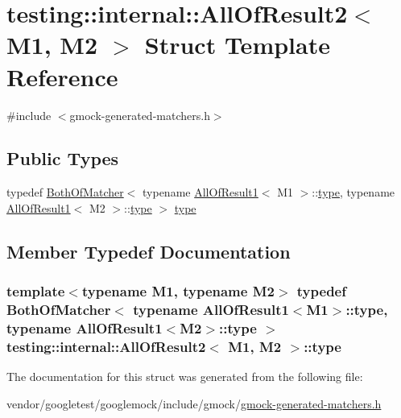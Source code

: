 \hypertarget{structtesting_1_1internal_1_1AllOfResult2}{}\section{testing\+:\+:internal\+:\+:All\+Of\+Result2$<$ M1, M2 $>$ Struct Template Reference}
\label{structtesting_1_1internal_1_1AllOfResult2}


{\ttfamily \#include $<$gmock-\/generated-\/matchers.\+h$>$}

\subsection*{Public Types}
\begin{DoxyCompactItemize}
\item 
typedef \hyperlink{classtesting_1_1internal_1_1BothOfMatcher}{Both\+Of\+Matcher}$<$ typename \hyperlink{structtesting_1_1internal_1_1AllOfResult1}{All\+Of\+Result1}$<$ M1 $>$\+::\hyperlink{structtesting_1_1internal_1_1AllOfResult2_adec0b0ce2fdd07d398e1fdd2cdb88392}{type}, typename \hyperlink{structtesting_1_1internal_1_1AllOfResult1}{All\+Of\+Result1}$<$ M2 $>$\+::\hyperlink{structtesting_1_1internal_1_1AllOfResult2_adec0b0ce2fdd07d398e1fdd2cdb88392}{type} $>$ \hyperlink{structtesting_1_1internal_1_1AllOfResult2_adec0b0ce2fdd07d398e1fdd2cdb88392}{type}
\end{DoxyCompactItemize}


\subsection{Member Typedef Documentation}
\subsubsection[{\texorpdfstring{type}{type}}]{\setlength{\rightskip}{0pt plus 5cm}template$<$typename M1, typename M2$>$ typedef {\bf Both\+Of\+Matcher}$<$ typename {\bf All\+Of\+Result1}$<$M1$>$\+::{\bf type}, typename {\bf All\+Of\+Result1}$<$M2$>$\+::{\bf type} $>$ {\bf testing\+::internal\+::\+All\+Of\+Result2}$<$ M1, M2 $>$\+::{\bf type}}\hypertarget{structtesting_1_1internal_1_1AllOfResult2_adec0b0ce2fdd07d398e1fdd2cdb88392}{}\label{structtesting_1_1internal_1_1AllOfResult2_adec0b0ce2fdd07d398e1fdd2cdb88392}


The documentation for this struct was generated from the following file\+:\begin{DoxyCompactItemize}
\item 
vendor/googletest/googlemock/include/gmock/\hyperlink{gmock-generated-matchers_8h}{gmock-\/generated-\/matchers.\+h}\end{DoxyCompactItemize}
